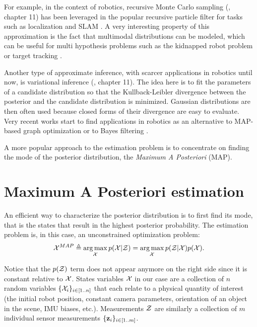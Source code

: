 For example, in the context of robotics, recursive Monte Carlo sampling (\cite{koller2009probabilistic}, chapter 11) has been 
leveraged in the popular recursive particle filter for tasks such as localization \cite{dellaert1999monte} and SLAM \cite{montemerlo2002fastslam}. A very interesting
property of this approximation is the fact that multimodal distributions can be modeled, which can be useful
for multi hypothesis problems such as the kidnapped robot problem \cite{dellaert1999monte} or target tracking \cite{gustafsson2002particle}. 

Another type of approximate inference, with scarcer applications in robotics until now, is variational inference (\cite{koller2009probabilistic}, chapter 11). 
The idea here is to fit the parameters of a candidate distribution so that the Kullback-Leibler 
divergence between the posterior and the candidate distribution is minimized. Gaussian distributions are then
often used because closed forms of their divergence are easy to evaluate. Very recent works start 
to find applications in robotics as an alternative to MAP-based graph optimization \cite{barfoot2020exactly, wong2020variational} 
or to Bayes filtering \cite{lambert2022recursive}. 

A more popular approach to the estimation problem is to concentrate on finding the mode of the posterior distribution, \aka the \textit{Maximum A Posteriori} (MAP).




\section{Maximum A Posteriori estimation}
\label{sec:MAP}

An efficient way to characterize the posterior distribution is to first find its mode, that is the states that 
result in the highest posterior probability. The estimation problem is, in this case, an unconstrained optimization problem:
%
\begin{equation}
    \label{eq:MAP_pbe}
    \mathcal{X}^{MAP} \triangleq \operatorname*{arg\,max}_{\mathcal{X}} p(\mathcal{X} | \mathcal{Z}) = \operatorname*{arg\,max}_{\mathcal{X}} p(\mathcal{Z} | \mathcal{X}) p(\mathcal{X}).
\end{equation}

Notice that the $p(\mathcal{Z})$ term does not appear anymore on the right side since it is constant relative to $\mathcal{X}$.
States variables $\mathcal{X}$ in our case are a collection of $n$ random variables $\{\mathcal{X}_i\}_{i \in [1..n]}$ that each relate to a physical quantity of 
interest (\eg the initial robot position, constant camera parameters, orientation of an object in the scene, IMU biases, etc.). Measurements $\mathcal{Z}$ are 
similarly a collection of $m$ individual sensor measurements $\{{\bf z}_i\}_{i \in [1..m]}$.

